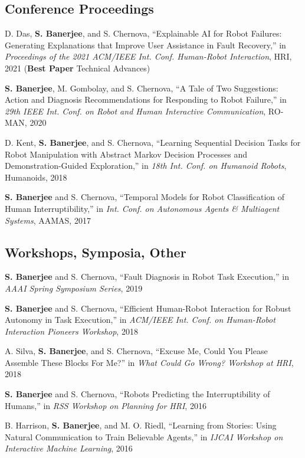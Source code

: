\documentclass[letterpaper]{article}
\renewenvironment{itemize}{
  \begin{list}{}{
    \setlength{\leftmargin}{1.5em}
  }
}{
  \end{list}
}
\begin{document}
\subsection*{Conference Proceedings}

\begin{itemize}
  \item D. Das, \textbf{S. Banerjee}, and S. Chernova, ``Explainable AI for Robot Failures: Generating Explanations that Improve User Assistance in Fault Recovery,'' in \textit{Proceedings of the 2021 ACM/IEEE Int. Conf. Human-Robot Interaction}, HRI, 2021 (\textbf{Best Paper} Technical Advances)

  \item \textbf{S. Banerjee}, M. Gombolay, and S. Chernova, ``A Tale of Two Suggestions: Action and Diagnosis Recommendations for Responding to Robot Failure,'' in \textit{29th IEEE Int. Conf. on Robot and Human Interactive Communication}, RO-MAN, 2020

  \item D. Kent, \textbf{S. Banerjee}, and S. Chernova, ``Learning Sequential Decision Tasks for Robot Manipulation with Abstract Markov Decision Processes and Demonstration-Guided Exploration,'' in \textit{18th Int. Conf. on Humanoid Robots}, Humanoids, 2018

  \item \textbf{S. Banerjee} and S. Chernova, ``Temporal Models for Robot Classification of Human Interruptibility,'' in \textit{Int. Conf. on Autonomous Agents \& Multiagent Systems}, AAMAS, 2017
\end{itemize}

\subsection*{Workshops, Symposia, Other}

\begin{itemize}
  \item \textbf{S. Banerjee} and S. Chernova, ``Fault Diagnosis in Robot Task Execution,'' in \textit{AAAI Spring Symposium Series}, 2019

  \item \textbf{S. Banerjee} and S. Chernova, ``Efficient Human-Robot Interaction for Robust Autonomy in Task Execution,'' in \textit{ACM/IEEE Int. Conf. on Human-Robot Interaction Pioneers Workshop}, 2018

  \item A. Silva, \textbf{S. Banerjee}, and S. Chernova, ``Excuse Me, Could You Please Assemble These Blocks For Me?'' in \textit{What Could Go Wrong? Workshop at HRI}, 2018

  \item \textbf{S. Banerjee} and S. Chernova, ``Robots Predicting the Interruptibility of Humans,'' in \textit{RSS Workshop on Planning for HRI}, 2016

  \item B. Harrison, \textbf{S. Banerjee}, and M. O. Riedl, ``Learning from Stories: Using Natural Communication to Train Believable Agents,'' in \textit{IJCAI Workshop on Interactive Machine Learning}, 2016
\end{itemize}
\end{document}
